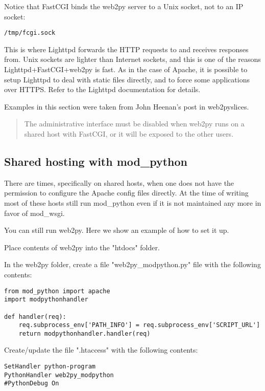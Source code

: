 \documentclass[justified,sixbynine,notoc]{tufte-book}
\begin{document}
\begin{fullwidth}
Notice that FastCGI binds the web2py server to a Unix socket,
not to an IP socket:
\begin{lstlisting}
/tmp/fcgi.sock
\end{lstlisting}

This is where Lighttpd forwards the HTTP requests to and receives responses from. Unix sockets are lighter than Internet sockets, and this is one of the reasons Lighttpd+FastCGI+web2py is fast.
As in the case of Apache, it is possible to setup Lighttpd to deal with static files directly, and to force some applications over HTTPS. Refer to the Lighttpd documentation for details.

Examples in this section were taken from John Heenan's post in web2pyslices.

\begin{quote}The administrative interface must be disabled when web2py runs on a shared host with FastCGI, or it will be exposed to the other users.\end{quote}
\goodbreak\subsection{Shared hosting with mod\_python}

There are times, specifically on shared hosts, when one does not have the permission to configure the Apache config files directly. At the time of writing most of these hosts still run mod\_python even if it is not maintained any more in favor of mod\_wsgi.

You can still run web2py. Here we show an example of how to set it up.

Place contents of web2py into the "htdocs" folder.

In the web2py folder, create a file "web2py\_modpython.py" file with the following contents:

\begin{lstlisting}
from mod_python import apache
import modpythonhandler

def handler(req):
    req.subprocess_env['PATH_INFO'] = req.subprocess_env['SCRIPT_URL']
    return modpythonhandler.handler(req)
\end{lstlisting}

Create/update the file ".htaccess" with the following contents:

\begin{lstlisting}
SetHandler python-program
PythonHandler web2py_modpython
#PythonDebug On
\end{lstlisting}


\end{fullwidth}
\end{document}
